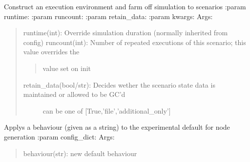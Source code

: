 \documentclass[letterpaper,10pt,english]{sphinxmanual}
\begin{document}
\begin{fulllineitems}
\begin{fulllineitems}
\begin{quote}
\begin{description}
\begin{itemize}
\end{itemize}

\end{description}\end{quote}

\end{fulllineitems}


\begin{fulllineitems}
\label{index:polybos.ExperimentManager.run}
Construct an execution environment and farm off simulation to scenarios
:param runtime:
:param runcount:
:param retain\_data:
:param kwargs:
Args:
\begin{quote}

runtime(int): Override simulation duration (normally inherited from config)
runcount(int): Number of repeated executions of this scenario; this value overrides the
\begin{quote}

value set on init
\end{quote}
\begin{description}
\item[{retain\_data(bool/str): Decides wether the scenario state data is maintained or allowed to be GC'd}] \leavevmode
can be one of {[}True,'file','additional\_only'{]}

\end{description}
\end{quote}

\end{fulllineitems}


\begin{fulllineitems}
\label{index:polybos.ExperimentManager.update_all_nodes}
Applys a behaviour (given as a string) to the experimental default for node generation
:param config\_dict:
Args:
\begin{quote}

behaviour(str): new default behaviour
\end{quote}

\end{fulllineitems}



\end{fulllineitems}
\end{document}
